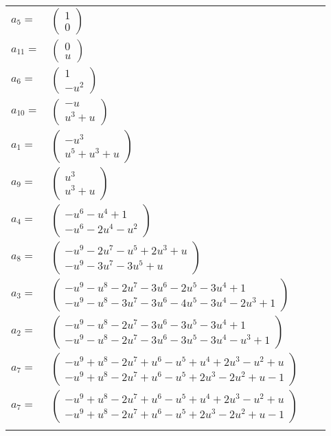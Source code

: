 \documentclass[1p]{elsarticle_modified}
\theoremstyle{definition}
\begin{document}
\begin{tabular}{m{7pt} m{180pt} m{7pt} m{180pt} }
\flushright $a_{5}=$&$\begin{pmatrix}1\\0\end{pmatrix}$ \\
\flushright $a_{11}=$&$\begin{pmatrix}0\\u\end{pmatrix}$ \\
\flushright $a_{6}=$&$\begin{pmatrix}1\\- u^2\end{pmatrix}$ \\
\flushright $a_{10}=$&$\begin{pmatrix}- u\\u^3+u\end{pmatrix}$ \\
\flushright $a_{1}=$&$\begin{pmatrix}- u^3\\u^5+u^3+u\end{pmatrix}$ \\
\flushright $a_{9}=$&$\begin{pmatrix}u^3\\u^3+u\end{pmatrix}$ \\
\flushright $a_{4}=$&$\begin{pmatrix}- u^6- u^4+1\\- u^6-2 u^4- u^2\end{pmatrix}$ \\
\flushright $a_{8}=$&$\begin{pmatrix}- u^9-2 u^7- u^5+2 u^3+u\\- u^9-3 u^7-3 u^5+u\end{pmatrix}$ \\
\flushright $a_{3}=$&$\begin{pmatrix}- u^9- u^8-2 u^7-3 u^6-2 u^5-3 u^4+1\\- u^9- u^8-3 u^7-3 u^6-4 u^5-3 u^4-2 u^3+1\end{pmatrix}$ \\
\flushright $a_{2}=$&$\begin{pmatrix}- u^9- u^8-2 u^7-3 u^6-3 u^5-3 u^4+1\\- u^9- u^8-2 u^7-3 u^6-3 u^5-3 u^4- u^3+1\end{pmatrix}$ \\
\flushright $a_{7}=$&$\begin{pmatrix}- u^9+u^8-2 u^7+u^6- u^5+u^4+2 u^3- u^2+u\\- u^9+u^8-2 u^7+u^6- u^5+2 u^3-2 u^2+u-1\end{pmatrix}$\\ \flushright $a_{7}=$&$\begin{pmatrix}- u^9+u^8-2 u^7+u^6- u^5+u^4+2 u^3- u^2+u\\- u^9+u^8-2 u^7+u^6- u^5+2 u^3-2 u^2+u-1\end{pmatrix}$\\&\end{tabular}
\end{document}
